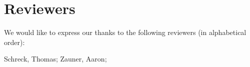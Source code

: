 \section{Reviewers}

We would like to express our thanks to the following reviewers (in alphabetical order):

Schreck, Thomas; 
Zauner, Aaron; 


